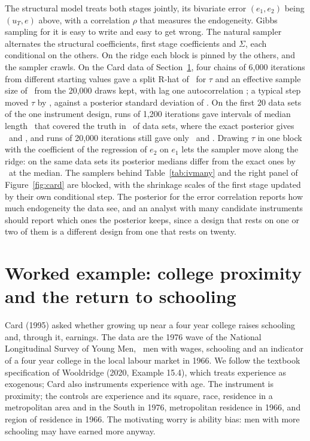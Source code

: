 The structural model treats both stages jointly, its bivariate error $(e_1, e_2)$ being $(u_T, e)$ above, with a correlation $\rho$ that measures the endogeneity. Gibbs sampling for it is easy to write and easy to get wrong. The natural sampler alternates the structural coefficients, first stage coefficients and $\Sigma$, each conditional on the others. On the ridge each block is pinned by the others, and the sampler crawls. On the Card data of Section~\ref{iv:sec:card}, four chains of 6{,}000 iterations from different starting values gave a split R-hat of \ivchcardoldrhat\ for $\tau$ and an effective sample size of \ivchcardoldess\ from the 20{,}000 draws kept, with lag one autocorrelation \ivchcardoldlag; a typical step moved $\tau$ by \ivchcardoldstep, against a posterior standard deviation of \ivchcardsd. On the first 20 data sets of the one instrument design, runs of 1{,}200 iterations gave intervals of median length \ivcholdlen\ that covered the truth in \ivcholdcov\ of data sets, where the exact posterior gives \ivchexactlen\ and \ivchexactcov, and runs of 20{,}000 iterations still gave only \ivcholdlonglen\ and \ivcholdlongcov. Drawing $\tau$ in one block with the coefficient of the regression of $e_2$ on $e_1$ lets the sampler move along the ridge: on the same data sets its posterior medians differ from the exact ones by \ivchblockdiff\ at the median. The samplers behind Table~\ref{tab:ivmany} and the right panel of Figure~\ref{fig:card} are blocked, with the shrinkage scales of the first stage updated by their own conditional step. The posterior for the error correlation reports how much endogeneity the data see, and an analyst with many candidate instruments should report which ones the posterior keeps, since a design that rests on one or two of them is a different design from one that rests on twenty.

\section[Worked example: college proximity]{Worked example: college proximity and the return to schooling}\label{iv:sec:card}

Card (1995) asked whether growing up near a four year college raises schooling and, through it, earnings. The data are the 1976 wave of the National Longitudinal Survey of Young Men, \ivcardn\ men with wages, schooling and an indicator of a four year college in the local labour market in 1966. We follow the textbook specification of Wooldridge (2020, Example 15.4), which treats experience as exogenous; Card also instruments experience with age. The instrument is proximity; the controls are experience and its square, race, residence in a metropolitan area and in the South in 1976, metropolitan residence in 1966, and region of residence in 1966. The motivating worry is ability bias: men with more schooling may have earned more anyway.

